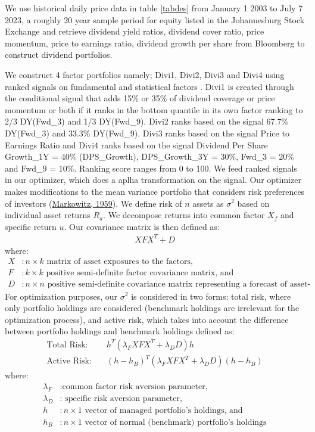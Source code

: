 \documentclass[11pt,preprint, authoryear]{elsarticle}
\numberwithin{equation}{section}
\numberwithin{figure}{section}
\numberwithin{table}{section}
\begin{document}
We use historical daily price data in table \ref{tabdes} from January 1
2003 to July 7 2023, a roughly 20 year sample period for equity listed
in the Johannesburg Stock Exchange and retrieve dividend yield ratios,
dividend cover ratio, price momentum, price to earnings ratio, dividend
growth per share from Bloomberg to construct dividend portfolios.

We construct 4 factor portfolios namely; Divi1, Divi2, Divi3 and Divi4
using ranked signals on fundamental and statistical factors . Divi1 is
created through the conditional signal that adds 15\% or 35\% of
dividend coverage or price momentum or both if it ranks in the bottom
quantile in its own factor ranking to 2/3 DY(Fwd\_3) and 1/3 DY(Fwd\_9).
Divi2 ranks based on the signal 67.7\% DY(Fwd\_3) and 33.3\% DY(Fwd\_9).
Divi3 ranks based on the signal Price to Earnings Ratio and Divi4 ranks
based on the signal Dividend Per Share Growth\_1Y = 40\% (DPS\_Growth),
DPS\_Growth\_3Y = 30\%, Fwd\_3 = 20\% and Fwd\_9 = 10\%. Ranking score
ranges from 0 to 100. We feed ranked signals in our optimizer, which
does a aplha transformation on the signal. Our optimizer makes
modifications to the mean variance portfolio that considers risk
preferences of investors
(\protect\hyperlink{ref-markowitz1959portfolio}{Markowitz, 1959}). We
define risk of \(n\) assets as \(\sigma^2\) based on individual asset
returns \(R_a\). We decompose returns into common factor \(X_f\) and
specific return \(u\). Our covariance matrix is then defined as: \[
\begin{aligned}
XFX^T + D
\end{aligned}
\] where: \begin{align*}
X & : n \times k \text{ matrix of asset exposures to the factors,} \\ F & : k \times k \text{ positive semi-definite factor covariance matrix, and} \\ D & : n \times n \text{ positive semi-definite covariance matrix representing a forecast of asset-specific risk.}
\end{align*} For optimization purposes, our \(\sigma^2\) is considered
in two forms: total risk, where only portfolio holdings are considered
(benchmark holdings are irrelevant for the optimization process), and
active risk, which takes into account the difference between portfolio
holdings and benchmark holdings defined as: \begin{align*}
\text{Total Risk:} & \quad h^T(\lambda_F X F X^T + \lambda_D D) h \\
\text{Active Risk:} & \quad (h - h_B)^T(\lambda_F X F X^T + \lambda_D D)(h - h_B)
\end{align*} where: \begin{align*}
\lambda_F & : \text{common factor risk aversion parameter,} \\
\lambda_D & : \text{ specific risk aversion parameter,} \\
h & : n \times 1 \text{ vector of managed portfolio's holdings, and} \\
h_B & : n \times 1 \text{ vector of normal (benchmark) portfolio's holdings}
\end{align*}
\end{document}
